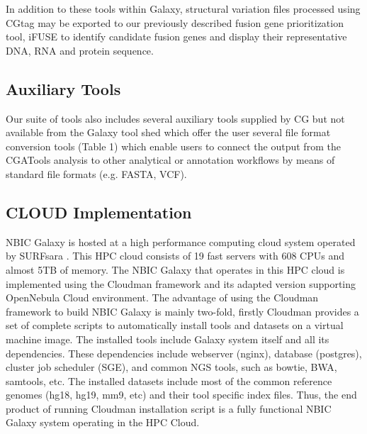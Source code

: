 \documentclass[10pt]{bmc_article}
\newenvironment{bmcformat}{\begin{raggedright}\baselineskip20pt\sloppy\setboolean{publ}{false}}{\end{raggedright}\baselineskip20pt\sloppy}
\begin{document}
\begin{bmcformat}
In addition to these tools within Galaxy, structural variation files processed using CGtag may be exported to our previously described fusion gene prioritization tool, iFUSE \cite{url-ifuse} to identify candidate fusion genes and display their representative DNA, RNA and protein sequence. 

\subsection*{Auxiliary Tools}
Our suite of tools also includes several auxiliary tools supplied by CG but not available from the Galaxy tool shed which offer the user several file format conversion tools (Table 1) which enable users to connect the output from the CGATools analysis to other analytical or annotation workflows by means of standard file formats (e.g. FASTA, VCF). 

\subsection*{CLOUD Implementation}
NBIC Galaxy is hosted at a high performance computing cloud system operated by SURFsara \cite{url-surfsara}. This HPC cloud consists of 19 fast servers with 608 CPUs and almost 5TB of memory. The NBIC Galaxy that operates in this HPC cloud is implemented using the Cloudman framework \cite{afgan} and its adapted version supporting OpenNebula Cloud environment. 
The advantage of using the Cloudman framework to build NBIC Galaxy is mainly two-fold, firstly  Cloudman provides a set of complete scripts to automatically install tools and datasets on a virtual machine image. The installed tools include Galaxy system itself and all its dependencies. These dependencies include webserver (nginx), database (postgres), cluster job scheduler (SGE), and common NGS tools, such as bowtie, BWA, samtools, etc. The installed datasets include most of the common reference genomes (hg18, hg19, mm9, etc) and their tool specific index files. Thus, the end product of running Cloudman installation script is a fully functional NBIC Galaxy system operating in the HPC Cloud. 


\end{bmcformat}
\end{document}
